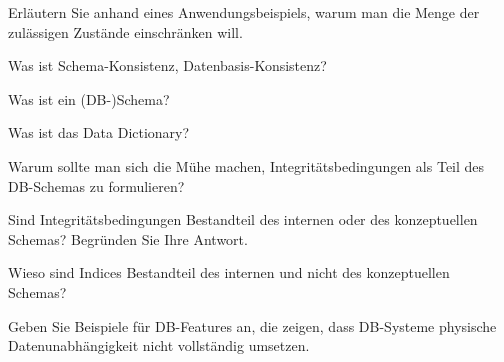 \begin{fragen}
	\begin{enumeration}
		\item Erläutern Sie anhand eines Anwendungsbeispiels, warum man die Menge der zulässigen Zustände einschränken will.
		\item Was ist Schema-Konsistenz, Datenbasis-Konsistenz?
		\item Was ist ein (DB-)Schema?
		\item Was ist das Data Dictionary?
		\item Warum sollte man sich die Mühe machen, Integritätsbedingungen als Teil des DB-Schemas zu formulieren?
		\item Sind Integritätsbedingungen Bestandteil des internen oder des konzeptuellen Schemas? Begründen Sie Ihre Antwort.
		\item Wieso sind Indices Bestandteil des internen und nicht des konzeptuellen Schemas?
		\item Geben Sie Beispiele für DB-Features an, die zeigen, dass DB-Systeme physische Datenunabhängigkeit nicht vollständig umsetzen.
	\end{enumeration}
\end{fragen}
